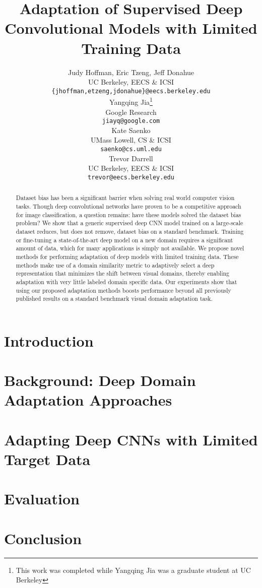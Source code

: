 \documentclass{article} %
\title{Adaptation of Supervised Deep Convolutional Models with Limited Training Data}
\author{
Judy Hoffman, Eric Tzeng, Jeff Donahue \\
UC Berkeley, EECS \& ICSI\\
\footnotesize{\texttt{\{jhoffman,etzeng,jdonahue\}@eecs.berkeley.edu} }\\
\And
Yangqing Jia\thanks{This work was completed while Yangqing Jia was a graduate student at UC Berkeley} \\
Google Research \\
\texttt{jiayq@google.com} \\
\AND
Kate Saenko \\
UMass Lowell, CS \& ICSI \\
\footnotesize{\texttt{saenko@cs.uml.edu}} \\
\And
Trevor Darrell \\
UC Berkeley, EECS \& ICSI\\
\footnotesize{\texttt{trevor@eecs.berkeley.edu}} \\
}
\begin{document}
\maketitle

\begin{abstract}
Dataset bias has been a significant barrier when solving real world computer vision tasks.
Though deep convolutional networks have proven to be a competitive approach for image classification, a question remains: have these models solved the dataset bias problem?
We show that a generic supervised deep CNN model trained on a large-scale dataset reduces, but does not remove, dataset bias on a standard benchmark.
Training or fine-tuning a state-of-the-art deep model on a new domain requires a significant amount of data, which for many applications is simply not available.
We propose novel methods for performing adaptation of deep models with limited training data.
These methods make use of a domain similarity metric to adaptively select a deep representation that minimizes the shift between visual domains, thereby enabling adaptation with very little labeled domain specific data.
Our experiments show that using our proposed adaptation methods boosts performance beyond all previously published results on a standard benchmark visual domain adaptation task.

\end{abstract}

\section{Introduction}


\vspace{-.3cm}
\section{Background: Deep Domain Adaptation Approaches}
\vspace{-.2cm}


\vspace{-.3cm}
\section{Adapting Deep CNNs with Limited Target Data}
\label{sec:adapt-algs}
\vspace{-.2cm}


\section{Evaluation}


\section{Conclusion}



\small{


}
\end{document}
